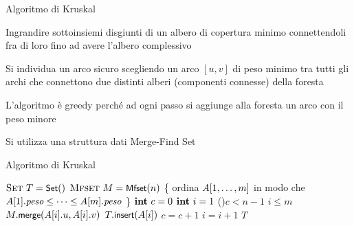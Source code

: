 \begin{frame}{Algoritmo di Kruskal}

\BIL
\item Ingrandire sottoinsiemi disgiunti di un albero di copertura minimo
connettendoli fra di loro fino ad avere l’albero complessivo
\item Si individua un arco sicuro scegliendo un arco $[u,v]$ di peso minimo tra
tutti gli archi che connettono due distinti alberi (componenti connesse) della
foresta
\item L’algoritmo è greedy perché ad ogni passo si aggiunge alla foresta un
arco con il peso minore
\EIL

\medskip
{}
\BIL
\item Si utilizza una struttura dati Merge-Find Set
\EIL

\end{frame}

\begin{frame}{Algoritmo di Kruskal}
	
\vspace{-12pt}
\begin{Procedure}
\caption[A]{\Set\ \kruskal($\textsc{edge}[\,]\ A,\ \INTEGER\ n,\ \INTEGER\ m$)}

$\textsc{Set}\ T = \textsf{{\small Set}}()$\;
$\textsc{Mfset}\ M = \textsf{{\small Mfset}}(n)$\;
\{ ordina $A[1, \ldots, m]$ in modo che $A[1].\textit{peso} \le \cdots \le A[m].\textit{peso}$ \}\;
$\INTEGER\ c = 0$\;
$\INTEGER\ i = 1$\;
\While(){$c < n-1$ \AND $i \leq m$}{
  {
    $M.\textsf{{\small merge}}(A[i].u, A[i].v)$\;
    $T.\textsf{{\small insert}}(A[i])$\;
    $c = c+1$\;
  }
  $i = i+1$\;	
}
\Return $T$\;
\end{Procedure}

\end{frame}

